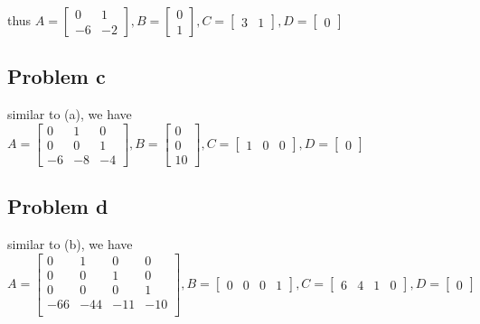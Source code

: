 \documentclass[12pt,a4paper]{article}
\begin{document}
thus
$
    A =
    \begin{bmatrix}
        0  & 1  \\
        -6 & -2
    \end{bmatrix},
    B =
    \begin{bmatrix}
        0 \\
        1
    \end{bmatrix},
    C = \begin{bmatrix}
        3 & 1
    \end{bmatrix},
    D =
    \begin{bmatrix}
        0
    \end{bmatrix}
$

\subsection*{Problem c}
similar to (a), we have
$
A = \begin{bmatrix}
    0  & 1 & 0  \\
    0 & 0 & 1 \\
    -6 & -8 & -4
\end{bmatrix},
B = \begin{bmatrix}
    0 \\
    0 \\
    10
\end{bmatrix},
C = \begin{bmatrix}
    1 & 0 &0
\end{bmatrix},
D = \begin{bmatrix}
    0
\end{bmatrix}
$

\subsection*{Problem d}
similar to (b), we have
$
A = \begin{bmatrix}
    0 & 1 & 0 & 0 \\
    0 & 0 & 1 & 0 \\
    0 & 0 & 0 & 1 \\
    -66 & -44 & -11 & -10 \\
\end{bmatrix},
B= \begin{bmatrix}
    0 &0 &0 &1
\end{bmatrix},
C= \begin{bmatrix}
    6 & 4 & 1 & 0
\end{bmatrix},
D = \begin{bmatrix}
    0
\end{bmatrix}
$
\end{document}
